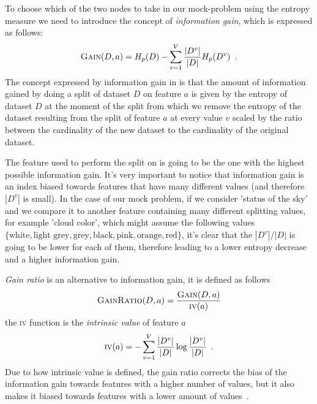 To choose which of the two nodes to take in our mock-problem using the entropy measure we need to
introduce the concept of \emph{information gain}, which is expressed as follows:
\begin{equation}
	\label{eq:information-gain}
	\textsc{Gain}(D, a) = H_p(D) - \sum_{v = 1}^V\frac{|D^v|}{|D|}H_p(D^v) \enspace.
\end{equation}
The concept expressed by information gain in is that the amount of information gained by doing a split of dataset $D$ on feature $a$ is given by the entropy of dataset $D$ at the moment of the split from which we remove the entropy of the dataset resulting from the split of feature $a$ at every value $v$ scaled by the ratio between the cardinality of the new dataset to the cardinality of the original dataset.

\smallskip

The feature used to perform the split on is going to be the one with the highest possible
information gain. It's very important to notice that information gain is an index biased towards
features that have many different values (and therefore $|D^v|$ is small). In the case of our mock
problem, if we consider 'status of the sky' and we compare it to another feature containing many
different splitting values, for example 'cloud color', which might assume the following values
$\{\text{white}, \text{light grey}, \text{grey}, \text{black}, \text{pink}, \text{orange},
	\text{red}\}$, it's clear that the $|D^v|/|D|$ is going to be lower for each of them, therefore
leading to a lower entropy decrease and a higher information gain.

\emph{Gain ratio} is an alternative to information gain, it is defined as follows
\begin{equation}
	\label{eq:gain-ratio}
	\textsc{GainRatio}(D, a) = \frac{\textsc{Gain}(D, a)}{\textsc{iv}(a)}
\end{equation}
the \textsc{iv} function is the \emph{intrinsic value} of feature $a$
\begin{equation}
	\label{eq:intrinsic-value}
	\textsc{iv}(a) = - \sum_{v = 1}^V\frac{|D^v|}{|D|} \log{\frac{|D^v|}{|D|}} \enspace.
\end{equation}
Due to how intrinsic value is defined, the gain ratio corrects the bias of the information gain
towards features with a higher number of values, but it also makes it biased towards features with a lower amount of values~\cite{ZhouZhi-Hua2021ML}.

\smallskip

